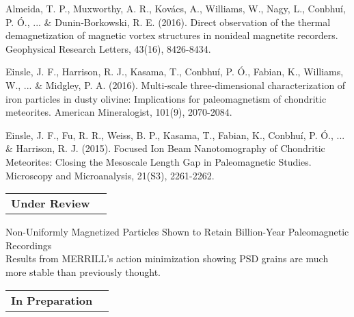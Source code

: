 \documentclass[11pt]{article}
\makeatletter
\newenvironment{resumeSubSectionHeader}{
    \par
    \begin{tabular*}{\textwidth}{l@{\extracolsep{\fill}}r}
    \par
} {
    \end{tabular*}
    \par
}
\newenvironment{resumeSubSectionBody}{
    \par
    \vspace{-0.8\parskip}
    \begin{small}
    \par
} {
    \par
    \end{small}
    \par
}
\makeatother
\begin{document}
\begin{resumeSubSectionBody}

Almeida, T. P., Muxworthy, A. R., Kov\'acs, A., Williams, W., Nagy, L.,
Conbhu\'i, P. \'O., ... \& Dunin‐Borkowski, R. E. (2016). Direct observation of
the thermal demagnetization of magnetic vortex structures in nonideal magnetite
recorders.  Geophysical Research Letters, 43(16), 8426-8434.

Einsle, J. F., Harrison, R. J., Kasama, T., Conbhu\'i, P. \'O., Fabian, K.,
Williams, W., ... \& Midgley, P. A. (2016). Multi-scale three-dimensional
characterization of iron particles in dusty olivine: Implications for
paleomagnetism of chondritic meteorites. American Mineralogist, 101(9),
2070-2084.

Einsle, J. F., Fu, R. R., Weiss, B. P., Kasama, T., Fabian, K., Conbhu\'i, P.
\'O., ... \& Harrison, R. J. (2015). Focused Ion Beam Nanotomography of
Chondritic Meteorites: Closing the Mesoscale Length Gap in Paleomagnetic
Studies.  Microscopy and Microanalysis, 21(S3), 2261-2262.

\end{resumeSubSectionBody}


\begin{resumeSubSectionHeader}
    \textbf{Under Review}
\end{resumeSubSectionHeader}

\begin{resumeSubSectionBody}
\begin{description}
    \item{
        Non-Uniformly Magnetized Particles Shown to Retain Billion-Year
        Paleomagnetic Recordings
    }\\
        Results from MERRILL's action minimization showing PSD grains are much
        more stable than previously thought.
\end{description}
\end{resumeSubSectionBody}


\begin{resumeSubSectionHeader}
    \textbf{In Preparation}
\end{resumeSubSectionHeader}
\end{document}
